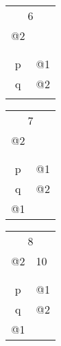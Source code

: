\begin{tabular}{c|p{1cm}|}
	\multicolumn{2}{c|}{6}\\
	@2&\\
	\hline
	&\\	
	\hline
	&\\
	\hline
	p&@1\\
	\hline
	q&@2\\
	\hline
	&\\	
	\hline
\end{tabular}
\begin{tabular}{c|p{1cm}|}
	\multicolumn{2}{c|}{7}\\
	@2&\\
	\hline
	&\\	
	\hline
	&\\
	\hline
	p&@1\\
	\hline
	q&@2\\
	\hline
	@1&\\	
	\hline
\end{tabular}
\begin{tabular}{c|p{1cm}|}
	\multicolumn{2}{c|}{8}\\
	@2&10\\
	\hline
	&\\	
	\hline
	&\\
	\hline
	p&@1\\
	\hline
	q&@2\\
	\hline
	@1&\\	
	\hline
\end{tabular}

